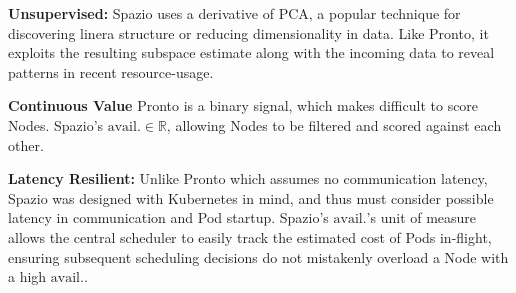 \textbf{Unsupervised:} Spazio uses a derivative of PCA, a popular technique for
discovering linera structure or reducing dimensionality in data. Like Pronto, it
exploits the resulting subspace estimate along with the incoming data to reveal
patterns in recent resource-usage.

\textbf{Continuous Value} Pronto is a binary signal, which makes difficult to
score Nodes. Spazio's $\text{avail.} \in \mathbb{R}$, allowing Nodes to be
filtered and scored against each other.

\textbf{Latency Resilient:} Unlike Pronto which assumes no communication
latency, Spazio was designed with Kubernetes in mind, and thus must consider
possible latency in communication and Pod startup. Spazio's $\text{avail.}$'s
unit of measure allows the central scheduler to easily track the estimated cost
of Pods in-flight, ensuring subsequent scheduling decisions do not mistakenly
overload a Node with a high $\text{avail.}$.
%
%
%
%
